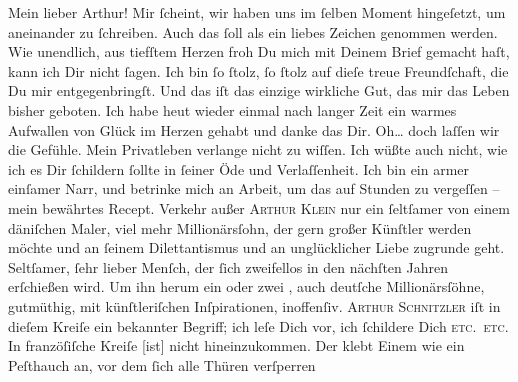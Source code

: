 \pstart\center{}Mein lieber Arthur!\pend\vspace{0.5em}
\pstart
           Mir{ }ſcheint, wir haben uns im{ }ſelben Moment hingeſetzt, um aneinander zu{ }ſchreiben.
               Auch das{ }ſoll als ein liebes Zeichen genommen werden. Wie unendlich, aus tiefſtem
               Herzen froh Du mich mit Deinem Brief gemacht haſt, kann ich Dir nicht{ }ſagen. Ich bin{ }ſo{ }ſtolz,{ }ſo{ }ſtolz auf dieſe treue Freundſchaft, die Du mir entgegenbringſt. Und das
               iſt das einzige wirkliche Gut, das mir das Leben bisher geboten. Ich habe heut wieder einmal {\pb}nach
               langer Zeit ein warmes Aufwallen von Glück im Herzen gehabt und danke das Dir. Oh{\dots} doch laſſen wir die Gefühle. Mein Privatleben verlange
               nicht zu wiſſen. Ich wüßte auch nicht, wie ich es Dir{ }ſchildern{ }ſollte in{ }ſeiner Öde
               und Verlaſſenheit. Ich bin ein armer einſamer Narr, und betrinke mich an Arbeit, um
               das auf Stunden zu vergeſſen – mein bewährtes Recept. Verkehr außer \textsc{Arthur Klein} nur ein{ }ſeltſamer \label{K_L02699-1v}\label{K_L02699-1} von einem däniſchen Maler, viel mehr Millionärsſohn, der gern großer Künſtler
               werden möchte und an{ }ſeinem Dilettantismus {\pb}und an
               unglücklicher Liebe zugrunde geht. Seltſamer,{ }ſehr lieber Menſch, der{ }ſich zweifellos in den nächſten
               Jahren erſchießen wird. Um ihn herum ein oder zwei \label{K_L02699-2v}\label{K_L02699-2}, auch deutſche Millionärsſöhne, gutmüthig, mit künſtleriſchen Inſpirationen,
               inoffenſiv. \textsc{Arthur Schnitzler} iſt in dieſem Kreiſe ein
               bekannter Begriff; ich leſe Dich vor, ich{ }ſchildere Dich \textsc{etc. etc.} In franzöſiſche Kreiſe {[}ist{]} nicht hineinzukommen. Der \label{K_L02699-3v}\label{K_L02699-3}{ } klebt Einem wie ein Peſthauch an, vor dem{ }ſich alle Thüren {\pb}verſperren{\dotsfour}\pend
           
